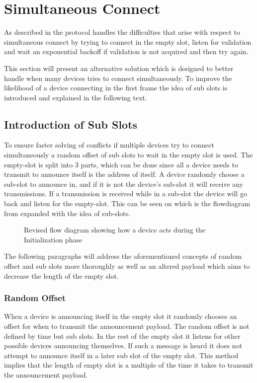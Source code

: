 \section{Simultaneous Connect}
As described in  the protocol handles the difficulties that arise with respect to simultaneous connect by trying to connect in the empty slot, listen for validation and wait an exponential backoff if validation is not acquired and then try again.

This section will present an alternative solution which is designed to better handle when many devices tries to connect simultaneously.
To improve the likelihood of a device connecting in the first frame the idea of sub slots is introduced and explained in the following text.

\subsection{Introduction of Sub Slots} %
\label{sub:introduction_of_sub_slots}
To ensure faster solving of conflicts if multiple devices try to connect simultaneously a random offset of sub slots to wait in the empty slot is used.
The empty-slot is split into 3 parts, which can be done since all a device needs to transmit to announce itself is the address of itself.
A device randomly choose a sub-slot to announce in, and if it is not the device's sub-slot it will receive any transmissions. 
If a transmission is received while in a sub-slot the device will go back and listen for the empty-slot.
This can be seen on  which is the flowdiagram from  expanded with the idea of sub-slots.

\begin{figure}[p]
    \centering \footnotesize
    
    \caption{Revised flow diagram showing how a device acts during the Initialization phase}
    \label{fig:pseudo_flowMultiConnectimp}
\end{figure}

The following paragraphs will address the aforementioned concepts of random offset and sub slots more thoroughly as well as an altered payload which aims to decrease the length of the empty slot.

\subsubsection{Random Offset}\label{roff}
When a device is announcing itself in the empty slot it randomly chooses an offset for when to transmit the announcement payload.
The random offset is not defined by time but sub slots. 
In the rest of the empty slot it listens for other possible devices announcing themselves.
If such a message is heard it does not attempt to announce itself in a later sub slot of the empty slot.
This method implies that the length of empty slot is a multiple of the time it takes to transmit the announcement payload.

